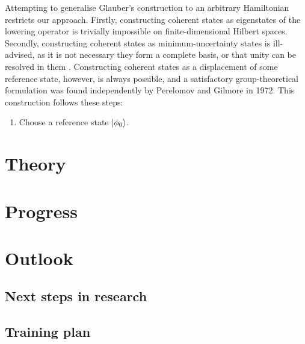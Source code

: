 \documentclass[12pt]{article}
\begin{document}
	Attempting to generalise Glauber's construction to an arbitrary Hamiltonian restricts our approach. Firstly, constructing coherent states as eigenstates of the lowering operator is trivially impossible on finite-dimensional Hilbert spaces. Secondly, constructing coherent states as minimum-uncertainty states is ill-advised, as it is not necessary they form a complete basis, or that unity can be resolved in them \cite{no_unity}. Constructing coherent states as a displacement of some reference state, however, is always possible, and a satisfactory group-theoretical formulation was found independently by Perelomov \cite{perelomov_og} and Gilmore \cite{gilmore_og} in 1972. This construction follows these steps:
	\begin{enumerate}
		\item Choose a reference state $\ket{\phi_0}$.
	\end{enumerate}
	
	
	
	\section{Theory}
	
	
	\section{Progress}
	
	
	
	\section{Outlook}
	\subsection{Next steps in research}
	
	\subsection{Training plan}
	
	
	
\end{document}
